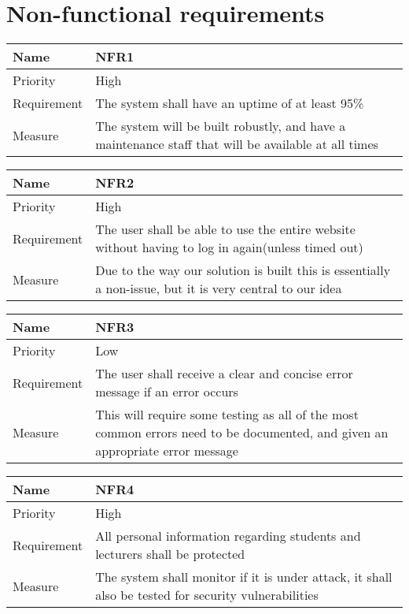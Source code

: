 \section{Non-functional requirements}

\begin{tabularx}{\textwidth}{|l|X|}
  \hline
  Name & NFR1 \\ \hline
  Priority & High \\ \hline
  Requirement & The system shall have an uptime of at least 95\% \\ \hline
  Measure & The system will be built robustly, and have a maintenance staff that will be available at all times \\ \hline
\end{tabularx}

\begin{tabularx}{\textwidth}{|l|X|}
  \hline
  Name & NFR2 \\ \hline
  Priority & High \\ \hline
  Requirement & The user shall be able to use the entire website without having to log in again(unless timed out) \\ \hline
  Measure & Due to the way our solution is built this is essentially a non-issue, but it is very central to our idea \\ \hline
\end{tabularx}

\begin{tabularx}{\textwidth}{|l|X|}
  \hline
  Name & NFR3 \\ \hline
  Priority & Low \\ \hline
  Requirement & The user shall receive a clear and concise error message if an error occurs \\ \hline
  Measure & This will require some testing as all of the most common errors need to be documented, and given an appropriate error message \\ \hline
\end{tabularx}

\begin{tabularx}{\textwidth}{|l|X|}
  \hline
  Name & NFR4 \\ \hline
  Priority & High \\ \hline
  Requirement & All personal information regarding students and lecturers shall be protected \\ \hline
  Measure & The system shall monitor if it is under attack, it shall also be tested for security vulnerabilities \\ \hline
\end{tabularx}